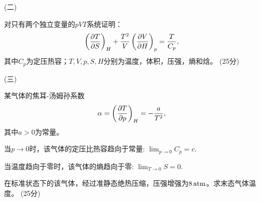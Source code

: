 \documentclass[10pt,CJK]{article}
\def\mark#1{{\color{blue} (#1分)}}
\begin{document}
  
\item[(二)]{
  对只有两个独立变量的$pVT$系统证明：
  $$\left(\frac{\partial T}{\partial S}\right)_{H} +\frac{T^2}{V} \left(\frac{\partial V}{\partial H}\right)_{p} = \frac{T}{C_p}, $$
  其中$C_p$为定压热容；$T, V, p, S, H$分别为温度，体积，压强，熵和焓。\mark{25}
  
  \vspace{5in}
  }

\item[(三)]{  某气体的焦耳-汤姆孙系数
  $$\alpha = \left(\frac{\partial T}{\partial p}\right)_{H} =-\frac{a}{T^2},$$
  其中$a>0$为常量。
  
  当$p\rightarrow 0$时，该气体的定压比热容趋向于常量: $\lim_{p\rightarrow 0}C_p = c.$

  当温度趋向于零时，该气体的熵趋向于零: $ \lim_{T\rightarrow 0} S = 0.$
  
  在标准状态下的该气体，经过准静态绝热压缩，压强增强为$8\,\mathrm{atm}$。求末态气体温度。\mark{25}
  }
  
  
\eitem


\ech
\end{document}
